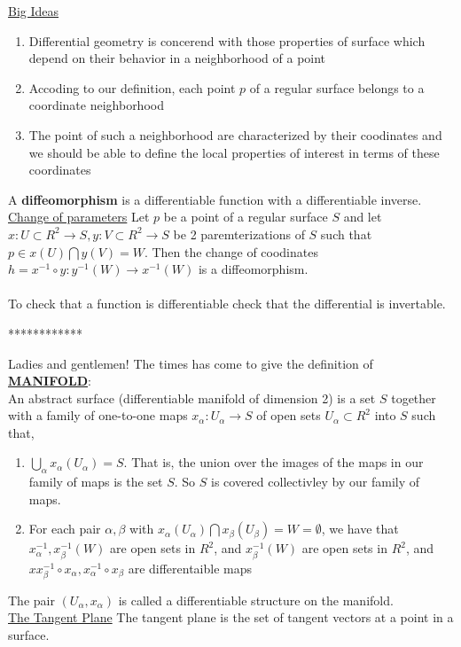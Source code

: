\documentclass[12pt,letterpaper]{hmcpset}
\begin{document}
\underline{Big Ideas}
\begin{enumerate}[label=\arabic*]
\item Differential geometry is concerend with those properties of surface which
  depend on their behavior in a neighborhood of a point
\item Accoding to our definition, each point $p$ of a regular surface belongs to
  a coordinate neighborhood
\item The point of such a neighborhood are characterized by their coodinates and
  we should be able to define the local properties of interest in terms of these coordinates
\end{enumerate}

A \textbf{diffeomorphism} is a differentiable function with a differentiable
inverse. \\

\underline{Change of parameters}
Let $p$ be a point of a regular surface $S$ and let $x: U \subset R^2 \rightarrow S, y: V \subset R^2
\rightarrow S$
be 2 paremterizations of $S$ such that $p \in x(U) \bigcap y(V) = W$. Then the change of
coodinates $h = x^{-1} \circ y: y^{-1}(W) \rightarrow x^{-1}(W)$ is a diffeomorphism. \\\\

To check that a function is differentiable check that the differential is
invertable. \\
\begin{center}
************ 
\end{center}
Ladies and gentlemen! The times has come to give the definition of
\underline{\textbf{MANIFOLD}}: \\
An abstract surface (differentiable manifold of dimension 2) is a set $S$
together with a family of one-to-one maps $x_{\alpha}: U_{\alpha} \rightarrow S$ of open sets $U_\alpha
\subset R^2$ into $S$ such that,
\begin{enumerate}[label=\arabic*]
\item $\bigcup_{\alpha} x_{\alpha}(U_{\alpha}) = S$. That is, the union over the images of the maps
  in our family of maps is the set $S$. So $S$ is covered collectivley by our
  family of maps.
\item For each pair $\alpha, \beta$ with $x_{\alpha}(U_{\alpha})
  \bigcap x_{\beta}(U_{\beta}) = W = \emptyset$, we have that $x_{\alpha}^{-1}, x_{\beta}^{-1}(W)$ are open
  sets in $R^2$, and $x_{\beta}^{-1}(W)$ are open sets in $R^2$, and $xx_{\beta}^{-1} \circ
  x_{\alpha}, x_{\alpha}^{-1} \circ x_{\beta}$ are differentaible maps
\end{enumerate}
The pair $(U_{\alpha}, x_{\alpha})$ is called a differentiable structure on the manifold.
\\

\underline{The Tangent Plane}
The tangent plane is the set of tangent vectors at a point in a surface. 
\end{document}
